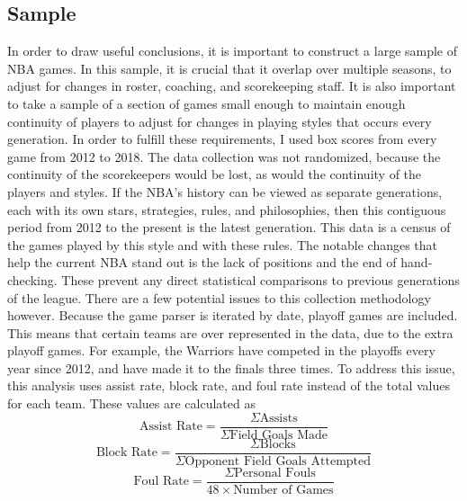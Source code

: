 \documentclass{article}
\begin{document}
\subsection{Sample}
In order to draw useful conclusions, it is important to construct a large sample of NBA games. In this sample, it is crucial that it overlap over multiple seasons, to adjust for changes in roster, coaching, and scorekeeping staff. It is also important to take a sample of a section of games small enough to maintain enough continuity of players to adjust for changes in playing styles that occurs every generation. In order to fulfill these requirements, I used box scores from every game from 2012 to 2018. The data collection was not randomized, because the continuity of the scorekeepers would be lost, as would the continuity of the players and styles. If the NBA's history can be viewed as separate generations, each with its own stars, strategies, rules, and philosophies, then this contiguous period from 2012 to the present is the latest generation. This data is a census of the games played by this style and with these rules. The notable changes that help the current NBA stand out is the lack of positions and the end of hand-checking. These prevent any direct statistical comparisons to previous generations of the league. There are a few potential issues to this collection methodology however. Because the game parser is iterated by date, playoff games are included. This means that certain teams are over represented in the data, due to the extra playoff games. For example, the Warriors have competed in the playoffs every year since 2012, and have made it to the finals three times. To address this issue, this analysis uses assist rate, block rate, and foul rate instead of the total values for each team. These values are calculated as
\begin{equation}
    \text{Assist Rate} = \frac{\Sigma \text{Assists}}{\Sigma \text{Field Goals Made}}
\end{equation}
\begin{equation}
    \text{Block Rate} = \frac{\Sigma \text{Blocks}}{\Sigma \text{Opponent Field Goals Attempted}}
\end{equation}
\begin{equation}
    \text{Foul Rate} = \frac{\Sigma \text{Personal Fouls}}{48\times \text{Number of Games}}
\end{equation}
\end{document}
